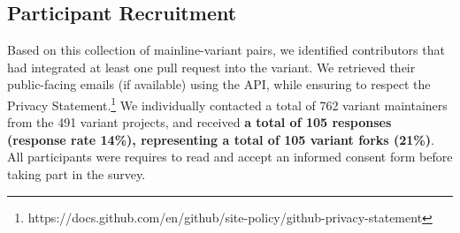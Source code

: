 

\subsection{Participant Recruitment}

Based on this collection of mainline-variant pairs, we identified contributors that had integrated at least one pull request into the variant. %
We retrieved their public-facing emails (if available) using the \gh API, while ensuring to respect the \gh Privacy Statement.\footnote{https://docs.github.com/en/github/site-policy/github-privacy-statement}
We individually contacted a total of 762 variant maintainers from the 491 variant projects, and received \textbf{a total of 105 responses (response rate 14\%), representing a total of 105 variant forks (21\%)}.
All participants were requires to read and accept an informed consent form before taking part in the survey.


